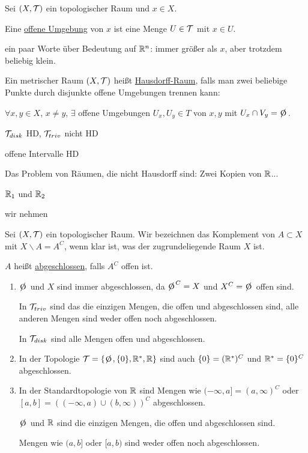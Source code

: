 \begin{definition}
    Sei $(X, \mathcal{T})$ ein topologischer Raum und $x \in X$.

    Eine \underline{offene Umgebung} von $x$ ist eine Menge $U \in \mathcal{T}$ mit $x \in U$.
\end{definition}

ein paar Worte über Bedeutung auf $\mathbb{R}^n$: immer größer als $x$, aber trotzdem beliebig klein.


\begin{definition}
    Ein metrischer Raum $(X, \mathcal{T})$ heißt \underline{Hausdorff-Raum}, falls man zwei beliebige Punkte durch disjunkte offene Umgebungen trennen kann:

    $\forall x, y \in X$, $x \neq y$, $\exists$ offene Umgebungen $U_x, U_y \in T$ von $x, y$ mit $U_x \cap V_y = \e$.
\end{definition}

\begin{example}
    $\mathcal{T}_{disk}$ HD, $\mathcal{T}_{triv}$ nicht HD

    offene Intervalle HD

    Das Problem von Räumen, die nicht Hausdorff sind:
    Zwei Kopien von $\mathbb{R}$...

    $\mathbb{R}_1$ und $\mathbb{R}_2$

    wir nehmen 
\end{example}

\begin{definition}
    Sei $(X, \mathcal{T})$ ein topologischer Raum. Wir bezeichnen das Komplement von $A \subset X$ mit $X \backslash A = A^C$, wenn klar ist, was der zugrundeliegende Raum $X$ ist.
    
    $A$ heißt \underline{abgeschlossen}, falls $A^C$ offen ist.
\end{definition}

\begin{example}
    \begin{enumerate}
        \item $\e$ und $X$ sind immer abgeschlossen, da $\e^C = X$ und $X^C = \e$ offen sind.
        
        In $\mathcal{T}_{triv}$ sind das die einzigen Mengen, die offen und abgeschlossen sind, alle anderen Mengen sind weder offen noch abgeschlossen.
        
        In $\mathcal{T}_{disk}$ sind alle Mengen offen und abgeschlossen.
        \item In der Topologie $\T = \{\e, \{0\}, \R^*, \R\}$ sind auch $\{0\} = (\mathbb{R}^*)^C$ und $\mathbb{R}^* = \{0\}^C$ abgeschlossen.
        \item In der Standardtopologie von $\mathbb{R}$ sind Mengen wie $(-\infty, a] = (a, \infty)^C$ oder $[a, b] = ((-\infty, a) \cup (b, \infty))^C$ abgeschlossen.

        $\e$ und $\mathbb{R}$ sind die einzigen Mengen, die offen und abgeschlossen sind.

        Mengen wie $(a, b]$ oder $[a, b)$ sind weder offen noch abgeschlossen.
    \end{enumerate}
\end{example}

